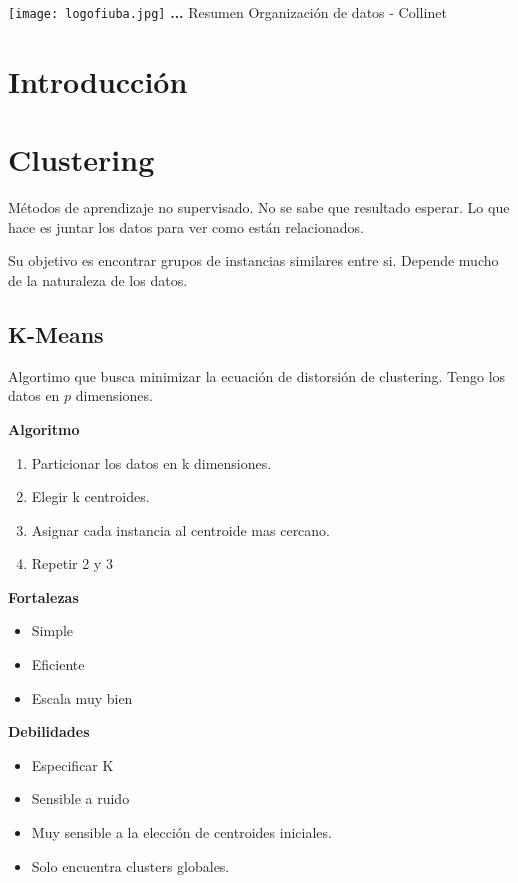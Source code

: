 \documentclass[titlepage,a4paper]{article}
\begin{document}
\begin{titlepage} %
	\hfill\texttt{[image: logofiuba.jpg]}
    \centering
    \vfill
    \Huge \textbf{...}
    \vskip2cm
    \Large Resumen Organización de datos - Collinet\\
    \vfill

    \vfill
    \vfill
\end{titlepage}

\tableofcontents %
\newpage

\section{Introducción}\label{sec:intro}


\section{Clustering}

Métodos de aprendizaje no supervisado. No se sabe que resultado esperar. Lo que hace es juntar los datos para ver como están relacionados.

Su objetivo es encontrar grupos de instancias similares entre si. Depende mucho de la naturaleza de los datos.


\subsection{K-Means}
Algortimo que busca minimizar la ecuación de distorsión de clustering. Tengo los datos en $p$ dimensiones.

\textbf{Algoritmo}
\begin{enumerate}
    \item Particionar los datos en k dimensiones. %
    \item Elegir k centroides.
    \item Asignar cada instancia al centroide mas cercano.
    \item Repetir 2 y 3
\end{enumerate}


\textbf{Fortalezas}
\begin{itemize}
    \item Simple
    \item Eficiente
    \item Escala muy bien
\end{itemize}

\textbf{Debilidades}
\begin{itemize}
    \item Especificar K
    \item Sensible a ruido
    \item Muy sensible a la elección de centroides iniciales.
    \item Solo encuentra clusters globales.
\end{itemize}
\end{document}
